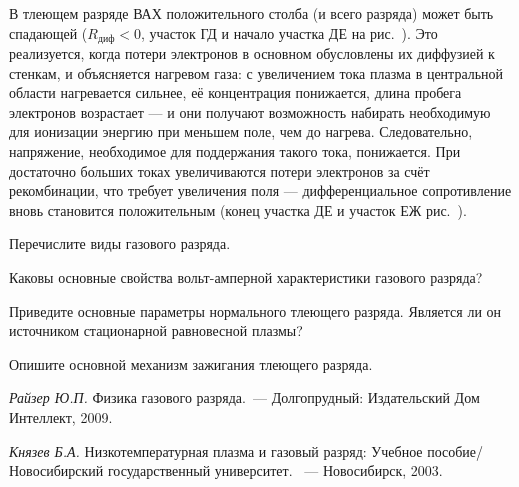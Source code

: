 В тлеющем разряде ВАХ положительного столба (и всего разряда) может быть
спадающей ($R_{диф}<0$, участок ГД и начало участка ДЕ на рис.~).
Это реализуется, когда потери электронов в основном обусловлены их диффузией к стенкам,
и объясняется нагревом газа: с увеличением тока плазма в центральной области
нагревается сильнее, её концентрация понижается, длина пробега электронов возрастает
--- и они получают возможность набирать необходимую для ионизации энергию при меньшем поле,
чем до нагрева. Следовательно, напряжение, необходимое для поддержания
такого тока, понижается. При достаточно больших токах увеличиваются
потери электронов за счёт рекомбинации, что требует увеличения поля ---
дифференциальное сопротивление вновь становится положительным
(конец участка ДЕ и участок ЕЖ рис.~).


\begin{lab:questions}
 \item Перечислите виды газового разряда.
 
 \item Каковы основные свойства вольт-амперной характеристики газового разряда?
 
 \item Приведите основные параметры нормального тлеющего разряда. Является ли он
 источником стационарной равновесной плазмы?
 
 \item Опишите основной механизм зажигания тлеющего разряда.
\end{lab:questions}

\begin{lab:literature}
   \item \textit{Райзер Ю.П.} Физика газового разряда.~--- Долгопрудный: Издательский
   Дом Интеллект, 2009.
   
   \item \textit{Князев Б.А.} Низкотемпературная плазма и газовый разряд: Учебное
   пособие/ Новосибирский государственный университет. ~--- Новосибирск, 2003.
\end{lab:literature}

